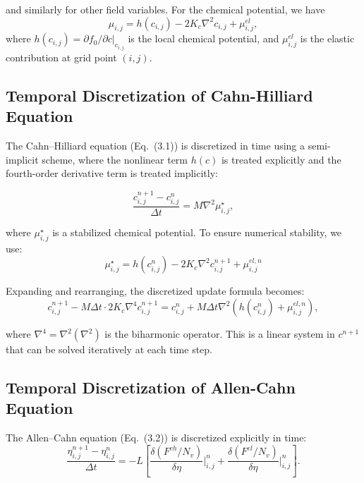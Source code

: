 and similarly for other field variables. For the chemical potential, we have
\begin{equation}
\mu_{i,j} = h(c_{i,j}) - 2K_c \nabla^2 c_{i,j} + \mu^{el}_{i,j},
\end{equation}
where $h(c_{i,j}) = \partial f_0/\partial c|_{c_{i,j}}$ is the local chemical potential, and $\mu^{el}_{i,j}$ is the elastic contribution at grid point $(i,j)$.

\subsection{Temporal Discretization of Cahn-Hilliard Equation}

The Cahn--Hilliard equation (Eq.~(3.1)) is discretized in time using a semi-implicit scheme, where the nonlinear term $h(c)$ is treated explicitly and the fourth-order derivative term is treated implicitly:

\begin{equation}\label{eq:ch_semi_implicit}
\frac{c_{i,j}^{n+1} - c_{i,j}^{n}}{\Delta t} = M \nabla^2 \mu_{i,j}^{\star},
\end{equation}

where $\mu_{i,j}^{\star}$ is a stabilized chemical potential. To ensure numerical stability, we use:
\begin{equation}
\mu_{i,j}^{\star} = h(c_{i,j}^{n}) - 2K_c \nabla^2 c_{i,j}^{n+1} + \mu_{i,j}^{el,n}
\end{equation}

Expanding and rearranging, the discretized update formula becomes:
\begin{equation}\label{eq:ch_update}
c_{i,j}^{n+1} - M\Delta t \cdot 2K_c \nabla^4 c_{i,j}^{n+1} = c_{i,j}^{n} + M\Delta t \nabla^2\left(h(c_{i,j}^{n}) + \mu_{i,j}^{el,n}\right),
\end{equation}

where $\nabla^4 = \nabla^2(\nabla^2)$ is the biharmonic operator. This is a linear system in $c^{n+1}$ that can be solved iteratively at each time step.

\subsection{Temporal Discretization of Allen-Cahn Equation}

The Allen--Cahn equation (Eq.~(3.2)) is discretized explicitly in time:
\begin{equation}\label{eq:ac_fd}
\frac{\eta_{i,j}^{n+1} - \eta_{i,j}^{n}}{\Delta t} = -L\left[\frac{\delta (F^{ch}/N_v)}{\delta \eta}\bigg|_{i,j}^{n} + \frac{\delta (F^{el}/N_v)}{\delta \eta}\bigg|_{i,j}^{n}\right].
\end{equation}

